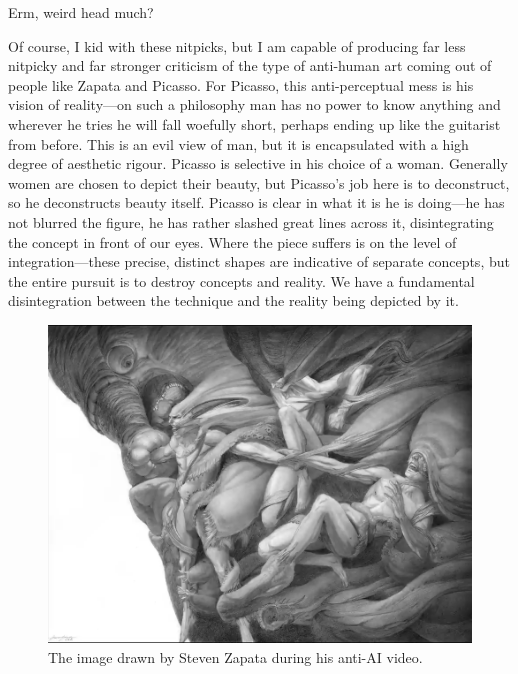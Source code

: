 \documentclass[11pt]{article}
\begin{document}
Erm, weird head much?

Of course, I kid with these nitpicks, but I am capable of producing far less nitpicky and far stronger criticism of the type of anti-human art coming out of people like Zapata and Picasso. For Picasso, this anti-perceptual mess is his vision of reality---on such a philosophy man has no power to know anything and wherever he tries he will fall woefully short, perhaps ending up like the guitarist from before. This is an evil view of man, but it is encapsulated with a high degree of aesthetic rigour. Picasso is selective in his choice of a woman. Generally women are chosen to depict their beauty, but Picasso's job here is to deconstruct, so he deconstructs beauty itself. Picasso is clear in what it is he is doing---he has not blurred the figure, he has rather slashed great lines across it, disintegrating the concept in front of our eyes. Where the piece suffers is on the level of integration---these precise, distinct shapes are indicative of separate concepts, but the entire pursuit is to destroy concepts and reality. We have a fundamental disintegration between the technique and the reality being depicted by it.

\begin{figure}[htbp]
\centering
\includegraphics[width=.9\linewidth]{./images/zapata collective anti-ai video.png}
\caption{The image drawn by Steven Zapata during his anti-AI video.}
\end{figure}
\end{document}
